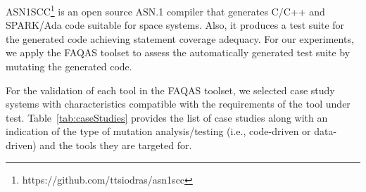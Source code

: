 ASN1SCC\footnote{https://github.com/ttsiodras/asn1scc} is an open source ASN.1 compiler that generates C/C++ and SPARK/Ada code suitable for space systems. Also, it produces a test suite for the generated code achieving statement coverage adequacy. For our experiments, we apply the FAQAS toolset to assess the automatically generated test suite by mutating the generated code.

For the validation of each tool in the FAQAS toolset, we selected case study systems with characteristics compatible with the requirements of the tool under test. Table~\ref{tab:caseStudies} provides the list of case studies along with an indication of the type of mutation analysis/testing (i.e., code-driven or data-driven) and the tools they are targeted for.  

